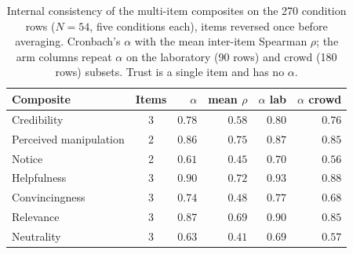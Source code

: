 \begin{table}[H]
\centering
\small
\caption{Internal consistency of the multi-item composites on the 270 condition rows (\(N=54\), five conditions each), items reversed once before averaging. Cronbach's \(\alpha\) with the mean inter-item Spearman \(\rho\); the arm columns repeat \(\alpha\) on the laboratory (90 rows) and crowd (180 rows) subsets. Trust is a single item and has no \(\alpha\).}
\label{tab:beh-alpha}
\begin{tabular}{@{}l c r r r r@{}}
\toprule
Composite & Items & \(\alpha\) & mean \(\rho\) & \(\alpha\) lab & \(\alpha\) crowd \\
\midrule
Credibility & 3 & $0.78$ & $0.58$ & $0.80$ & $0.76$ \\
Perceived manipulation & 2 & $0.86$ & $0.75$ & $0.87$ & $0.85$ \\
Notice & 2 & $0.61$ & $0.45$ & $0.70$ & $0.56$ \\
\midrule
Helpfulness & 3 & $0.90$ & $0.72$ & $0.93$ & $0.88$ \\
Convincingness & 3 & $0.74$ & $0.48$ & $0.77$ & $0.68$ \\
Relevance & 3 & $0.87$ & $0.69$ & $0.90$ & $0.85$ \\
Neutrality & 3 & $0.63$ & $0.41$ & $0.69$ & $0.57$ \\
\bottomrule
\end{tabular}
\end{table}
